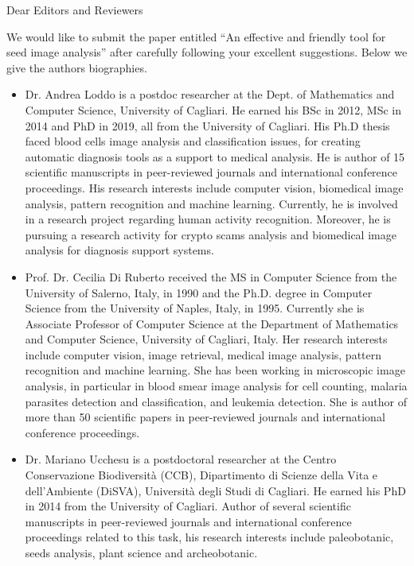 \documentclass{letter}
\begin{document}
	\begin{letter}{}
		
		\opening{Dear Editors and Reviewers}
		
		We would like to submit the paper entitled ``An effective and friendly tool for seed image analysis'' after carefully following your excellent suggestions.
		Below we give the authors biographies.
		\begin{itemize}
		\item Dr. Andrea Loddo is a postdoc researcher at the Dept. of Mathematics and Computer Science, University of Cagliari. He earned his BSc  in 2012, MSc in 2014 and PhD in 2019, all from the University of Cagliari. His Ph.D thesis faced blood cells image analysis and classification issues, for creating automatic diagnosis tools as a support to medical analysis. He is author of 15 scientific manuscripts in peer-reviewed journals and international conference proceedings. His research interests include computer vision, biomedical image analysis, pattern recognition and machine learning. Currently, he is involved in a research project regarding human activity recognition. Moreover, he is pursuing a research activity for crypto scams analysis and biomedical image analysis for diagnosis support systems.
		\item Prof. Dr. Cecilia Di Ruberto received the MS in Computer Science from the University of Salerno, Italy, in 1990 and the Ph.D. degree in Computer Science from the University of Naples, Italy, in 1995. Currently she is Associate Professor of Computer Science at the Department of Mathematics and Computer Science, University of Cagliari, Italy. Her research interests include computer vision, image retrieval, medical image analysis, pattern recognition and machine learning.  She has been working in microscopic image analysis, in particular in blood smear image analysis for cell counting, malaria parasites detection and classification, and leukemia detection. She is author of more than 50 scientific papers in peer-reviewed journals and international conference proceedings.
		\item Dr. Mariano Ucchesu is a postdoctoral researcher at the Centro Conservazione Biodiversità (CCB), Dipartimento di Scienze della Vita e dell’Ambiente (DiSVA), Università degli Studi di Cagliari. He earned his PhD in 2014 from the University of Cagliari. Author of several scientific manuscripts in peer-reviewed journals and international conference proceedings related to this task, his research interests include paleobotanic, seeds analysis, plant science and archeobotanic.

\end{itemize}
\end{letter}
\end{document}
